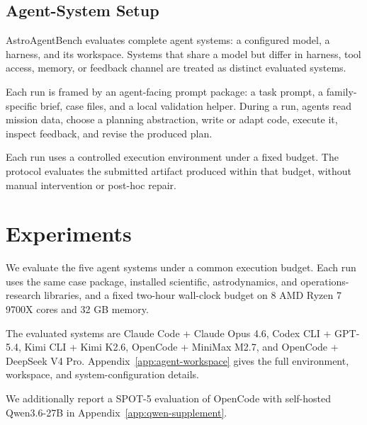 \documentclass[11pt]{article}
\begin{document}
\subsection{Agent-System Setup}
\label{sec:agent-system-setup}

AstroAgentBench evaluates complete agent systems: a configured model, a harness, and its workspace. Systems that share a model but differ in harness, tool access, memory, or feedback channel are treated as distinct evaluated systems.

Each run is framed by an agent-facing prompt package: a task prompt, a family-specific brief, case files, and a local validation helper. During a run, agents read mission data, choose a planning abstraction, write or adapt code, execute it, inspect feedback, and revise the produced plan.

Each run uses a controlled execution environment under a fixed budget. The protocol evaluates the submitted artifact produced within that budget, without manual intervention or post-hoc repair.

\section{Experiments}
\label{sec:experiments}

We evaluate the five agent systems under a common execution budget. Each run uses the same case package, installed scientific, astrodynamics, and operations-research libraries, and a fixed two-hour wall-clock budget on 8 AMD Ryzen 7 9700X cores and 32 GB memory.

The evaluated systems are Claude Code + Claude Opus 4.6, Codex CLI + GPT-5.4, Kimi CLI + Kimi K2.6, OpenCode + MiniMax M2.7, and OpenCode + DeepSeek V4 Pro. Appendix~\ref{app:agent-workspace} gives the full environment, workspace, and system-configuration details.

We additionally report a SPOT-5 evaluation of OpenCode with self-hosted Qwen3.6-27B in Appendix~\ref{app:qwen-supplement}.
\end{document}
